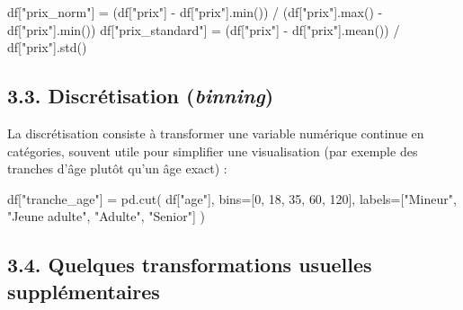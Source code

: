 \documentclass[
  french,
  letterpaper,
  open=any]{scrbook}
\newenvironment{Shaded}{\begin{snugshade}}{\end{snugshade}}
\newcommand{\BuiltInTok}[1]{\textcolor[rgb]{0.00,0.23,0.31}{#1}}
\newcommand{\DecValTok}[1]{\textcolor[rgb]{0.68,0.00,0.00}{#1}}
\newcommand{\NormalTok}[1]{\textcolor[rgb]{0.00,0.23,0.31}{#1}}
\newcommand{\OperatorTok}[1]{\textcolor[rgb]{0.37,0.37,0.37}{#1}}
\newcommand{\StringTok}[1]{\textcolor[rgb]{0.13,0.47,0.30}{#1}}
\theoremstyle{definition}
\theoremstyle{definition}
\theoremstyle{remark}
\begin{document}
\begin{Shaded}
\begin{Highlighting}[]
\NormalTok{df[}\StringTok{"prix\_norm"}\NormalTok{] }\OperatorTok{=}\NormalTok{ (df[}\StringTok{"prix"}\NormalTok{] }\OperatorTok{{-}}\NormalTok{ df[}\StringTok{"prix"}\NormalTok{].}\BuiltInTok{min}\NormalTok{()) }\OperatorTok{/}\NormalTok{ (df[}\StringTok{"prix"}\NormalTok{].}\BuiltInTok{max}\NormalTok{() }\OperatorTok{{-}}\NormalTok{ df[}\StringTok{"prix"}\NormalTok{].}\BuiltInTok{min}\NormalTok{())}
\NormalTok{df[}\StringTok{"prix\_standard"}\NormalTok{] }\OperatorTok{=}\NormalTok{ (df[}\StringTok{"prix"}\NormalTok{] }\OperatorTok{{-}}\NormalTok{ df[}\StringTok{"prix"}\NormalTok{].mean()) }\OperatorTok{/}\NormalTok{ df[}\StringTok{"prix"}\NormalTok{].std()}
\end{Highlighting}
\end{Shaded}

\subsection{\texorpdfstring{3.3. Discrétisation
(\emph{binning})}{3.3. Discrétisation (binning)}}\label{discruxe9tisation-binning}

La discrétisation consiste à transformer une variable numérique continue
en catégories, souvent utile pour simplifier une visualisation (par
exemple des tranches d'âge plutôt qu'un âge exact) :

\begin{Shaded}
\begin{Highlighting}[]
\NormalTok{df[}\StringTok{"tranche\_age"}\NormalTok{] }\OperatorTok{=}\NormalTok{ pd.cut(}
\NormalTok{    df[}\StringTok{"age"}\NormalTok{],}
\NormalTok{    bins}\OperatorTok{=}\NormalTok{[}\DecValTok{0}\NormalTok{, }\DecValTok{18}\NormalTok{, }\DecValTok{35}\NormalTok{, }\DecValTok{60}\NormalTok{, }\DecValTok{120}\NormalTok{],}
\NormalTok{    labels}\OperatorTok{=}\NormalTok{[}\StringTok{"Mineur"}\NormalTok{, }\StringTok{"Jeune adulte"}\NormalTok{, }\StringTok{"Adulte"}\NormalTok{, }\StringTok{"Senior"}\NormalTok{]}
\NormalTok{)}
\end{Highlighting}
\end{Shaded}

\subsection{3.4. Quelques transformations usuelles
supplémentaires}\label{quelques-transformations-usuelles-suppluxe9mentaires}
\end{document}
